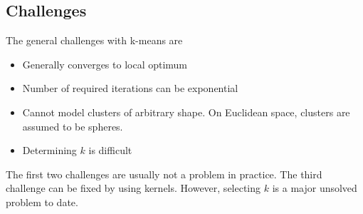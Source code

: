 \subsection{Challenges}
The general challenges with k-means are
\begin{itemize}
	\item Generally converges to local optimum
	\item Number of required iterations can be exponential
	\item Cannot model clusters of arbitrary shape.
	On Euclidean space, clusters are assumed to be spheres.
	\item Determining $k$ is difficult
\end{itemize}

The first two challenges are usually not a problem in practice.
The third challenge can be fixed by using kernels.
However, selecting $k$ is a major unsolved problem to date.

